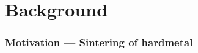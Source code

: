 \documentclass[11pt]{beamer} %
\begin{document}
\section{Background}
\begin{frame}
 \frametitle{Motivation --- Sintering of hardmetal}



\end{frame}
\end{document}
